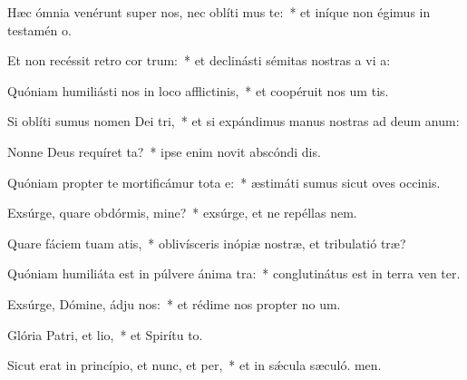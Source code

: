 \item Hæc ómnia venérunt super nos, nec oblíti mus te:~* et iníque non égimus in testamén o.
\item Et non recéssit retro cor trum:~* et declinásti sémitas nostras a vi a:
\item Quóniam humiliásti nos in loco afflictinis,~* et coopéruit nos um tis.
\item Si oblíti sumus nomen Dei tri,~* et si expándimus manus nostras ad deum anum:
\item Nonne Deus requíret ta?~* ipse enim novit abscóndi dis.
\item Quóniam propter te mortificámur tota e:~* æstimáti sumus sicut oves occinis.
\item Exsúrge, quare obdórmis, mine?~* exsúrge, et ne repéllas  nem.
\item Quare fáciem tuam atis,~* oblivísceris inópiæ nostræ, et tribulatió træ?
\item Quóniam humiliáta est in púlvere ánima tra:~* conglutinátus est in terra ven ter.
\item Exsúrge, Dómine, ádju nos:~* et rédime nos propter no um.
\item Glória Patri, et lio,~* et Spirítu to.
\item Sicut erat in princípio, et nunc, et per,~* et in sǽcula sæculó. men.
